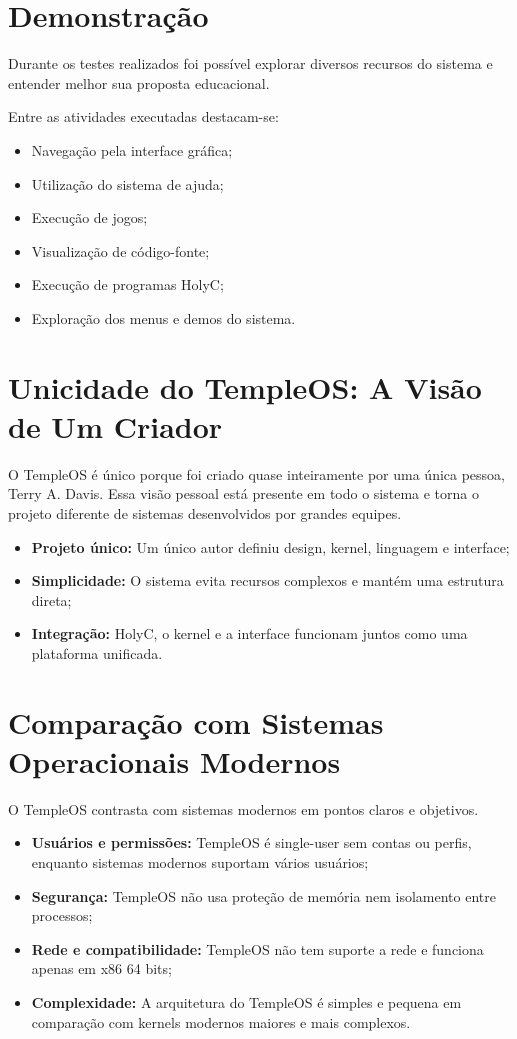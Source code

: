 \documentclass[12pt,oneside,a4paper,chapter=TITLE]{abntex2}
\begin{document}
\section{Demonstração}

Durante os testes realizados foi possível explorar diversos recursos do
sistema e entender melhor sua proposta educacional.

Entre as atividades executadas destacam-se:

\begin{itemize}
    \item Navegação pela interface gráfica;
    \item Utilização do sistema de ajuda;
    \item Execução de jogos;
    \item Visualização de código-fonte;
    \item Execução de programas HolyC;
    \item Exploração dos menus e demos do sistema.
\end{itemize}

\section{Unicidade do TempleOS: A Visão de Um Criador}

O TempleOS é único porque foi criado quase inteiramente por uma única pessoa, Terry A. Davis. Essa visão pessoal está presente em todo o sistema e torna o projeto diferente de sistemas desenvolvidos por grandes equipes.

\begin{itemize}
    \item \textbf{Projeto único:} Um único autor definiu design, kernel, linguagem e interface;
    \item \textbf{Simplicidade:} O sistema evita recursos complexos e mantém uma estrutura direta;
    \item \textbf{Integração:} HolyC, o kernel e a interface funcionam juntos como uma plataforma unificada.
\end{itemize}

\section{Comparação com Sistemas Operacionais Modernos}

O TempleOS contrasta com sistemas modernos em pontos claros e objetivos.

\begin{itemize}
    \item \textbf{Usuários e permissões:} TempleOS é single-user sem contas ou perfis, enquanto sistemas modernos suportam vários usuários;
    \item \textbf{Segurança:} TempleOS não usa proteção de memória nem isolamento entre processos;
    \item \textbf{Rede e compatibilidade:} TempleOS não tem suporte a rede e funciona apenas em x86 64 bits;
    \item \textbf{Complexidade:} A arquitetura do TempleOS é simples e pequena em comparação com kernels modernos maiores e mais complexos.
\end{itemize}
\end{document}
